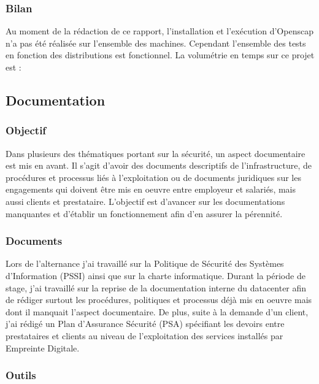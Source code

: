 \documentclass[12pt]{article}
\begin{document}
\subsubsection{Bilan}
Au moment de la rédaction de ce rapport, l'installation et l'exécution d'Openscap n'a pas été réalisée sur l'ensemble des machines. Cependant l'ensemble des tests en fonction des distributions est fonctionnel.
La volumétrie en temps sur ce projet est :


\newpage
\subsection{Documentation}
\subsubsection{Objectif}
Dans plusieurs des thématiques portant sur la sécurité, un aspect documentaire est mis en avant. Il s'agit d'avoir des documents descriptifs de l'infrastructure, de procédures et processus liés à l'exploitation ou de documents juridiques sur les engagements qui doivent être mis en oeuvre entre employeur et salariés, mais aussi clients et prestataire. L'objectif est d'avancer sur les documentations manquantes et d'établir un fonctionnement afin d'en assurer la pérennité.

\subsubsection{Documents}
Lors de l'alternance j'ai travaillé sur la Politique de Sécurité des Systèmes d'Information (PSSI) ainsi que sur la charte informatique. Durant la période de stage, j'ai travaillé sur la reprise de la documentation interne du datacenter afin de rédiger surtout les procédures, politiques et processus déjà mis en oeuvre mais dont il manquait l'aspect documentaire.
De plus, suite à la demande d'un client, j'ai rédigé un Plan d'Assurance Sécurité (PSA) spécifiant les devoirs entre prestataires et clients au niveau de l'exploitation des services installés par Empreinte Digitale.

\subsubsection{Outils}
\end{document}
